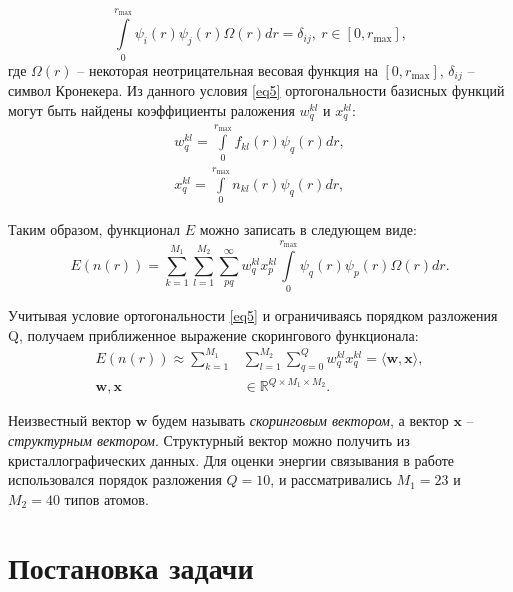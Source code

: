 \documentclass[CEJM,PDF]{Class+Reg_in_Molec_Docking} %
\begin{document}
\begin{equation}\label{eq5}
\int\limits_{0}^{r_{\text{max}}}\psi_i(r)\psi_j(r)\Omega(r)dr = \delta_{ij}, \ r\in[0,r_{\text{max}}],
\end{equation}
где $\Omega(r)$ -- некоторая неотрицательная весовая функция на $[0,r_{\text{max}}]$, $\delta_{ij}$ -- символ Кронекера. Из данного условия \eqref{eq5} ортогональности базисных функций могут быть найдены коэффициенты раложения $w_q^{kl}$ и $x_q^{kl}$:
\begin{equation}\label{eq6}
\begin{split}
w_q^{kl}=\int\limits_{0}^{r_{\text{max}}}f_{kl}(r)\psi_q(r)dr, \\
x_q^{kl}=\int\limits_{0}^{r_{\text{max}}}n_{kl}(r)\psi_q(r)dr,
\end{split}
\end{equation}

Таким образом, функционал $E$ можно записать в следующем виде:
\begin{equation}\label{eq7}
E(n(r)) = \sum_{k=1}^{M_1} \sum_{l=1}^{M_2} \sum_{pq}^{\infty}w_q^{kl}x_p^{kl}\int\limits_{0}^{r_{\text{max}}}\psi_q(r)\psi_p(r)\Omega(r)dr.
\end{equation}

Учитывая условие ортогональности \eqref{eq5} и ограничиваясь порядком разложения Q, получаем приближенное выражение скорингового функционала: 
\begin{equation}\label{eq8}
\begin{split}
E(n(r)) \approx \sum_{k=1}^{M_1} & \sum_{l=1}^{M_2} \sum_{q=0}^{Q}w_q^{kl}x_q^{kl} = \langle\mathbf{w},\mathbf{x}\rangle,\\
\mathbf{w}, \mathbf{x} & \in \mathbb{R}^{Q\times M_1\times M_2}.
\end{split}
\end{equation}

Неизвестный вектор $\mathbf{w}$ будем называть \textit{скоринговым вектором}, а вектор $\mathbf{x}$ -- \textit{структурным вектором}. Структурный вектор можно получить из кристаллографических данных. Для оценки энергии связывания в работе \cite{grudinin2016predicting} использовался порядок разложения $Q=10$, и рассматривались $M_1 = 23$ и $M_2 = 40$ типов атомов.

\section{Постановка задачи}
\end{document}
